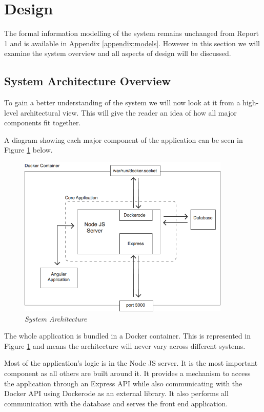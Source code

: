\section{Design}
\label{sec:design}
The formal information modelling of the system remains unchanged from Report 1 and is available in Appendix \ref{appendix:models}. However in this section we will examine the system overview and all aspects of design will be discussed.

\subsection{System Architecture Overview}
To gain a better understanding of the system we will now look at it from a high-level architectural view. This will give the reader an idea of how all major components fit together.

A diagram showing each major component of the application can be seen in Figure \ref{fig:architecture} below.

\begin{figure}[!ht]
\centering
\includegraphics*[width=0.9\textwidth]{images/architecture}
\caption{\em System Architecture}
\label{fig:architecture}
\end{figure}

The whole application is bundled in a \gls{Docker container}. This is represented in Figure \ref{fig:architecture} and means the architecture will never vary across different systems.

Most of the application's logic is in the Node JS server. It is the most important component as all others are built around it. It provides a mechanism to access the application through an Express API while also communicating with the Docker API using Dockerode as an external library. It also performs all communication with the database and serves the front end application.

